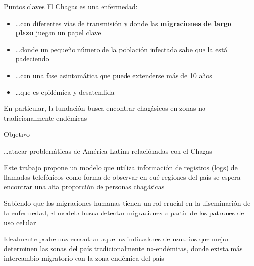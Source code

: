 \documentclass[xcolor=x11names]{beamer}
\begin{document}
\begin{frame}{Puntos claves}
	El Chagas es una enfermedad:
	\begin{itemize}
		\item \ldots con diferentes vías de transmisión y donde las \textbf{migraciones de largo plazo} juegan un papel clave
		\item \ldots donde un pequeño número de la población infectada sabe que la está padeciendo
		\item \ldots con una fase asintomática que puede extenderse más de 10 años
		\item \ldots que es epidémica y desatendida
	\end{itemize}
	En particular, la fundación busca encontrar chagásicos en zonas no tradicionalmente endémicas
\end{frame}


\begin{frame}{Objetivo}
	\begin{block}{\ldots atacar problemáticas de América Latina relaciónadas con el Chagas}

	Este trabajo propone un modelo que utiliza información de registros (logs) de llamados telefónicos
	como forma de observar en qué regiones del país se espera encontrar una alta proporción de personas chagásicas

	\bigskip
	Sabiendo que las migraciones humanas tienen un rol crucial en la diseminación de la enfermedad, el modelo busca
	detectar migraciones a partir de los patrones de uso celular

	\bigskip
	Idealmente podremos encontrar aquellos indicadores de usuarios que mejor determinen las zonas del país tradicionalmente no-endémicas, donde exista más intercambio migratorio con la zona endémica del país
	\end{block}
\end{frame}
\end{document}
